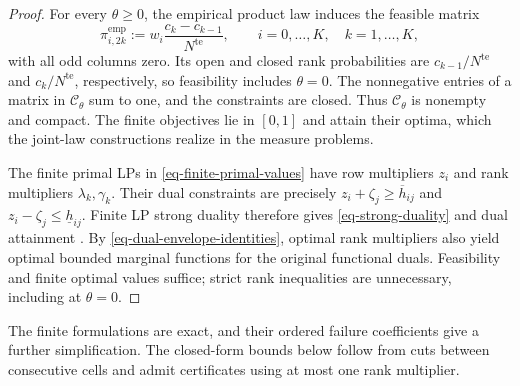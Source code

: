 \begin{proof}
  For every $\theta\ge0$, the empirical product law induces the feasible matrix
  \[
    \pi_{i,2k}^{\mathrm{emp}}:=w_i\frac{c_k-c_{k-1}}{N^{\mathrm{te}}},
    \qquad i=0,\ldots,K,\quad k=1,\ldots,K,
  \]
  with all odd columns zero. Its open and closed rank probabilities are $c_{k-1}/N^{\mathrm{te}}$ and $c_k/N^{\mathrm{te}}$, respectively, so feasibility includes $\theta=0$. The nonnegative entries of a matrix in $\mathcal C_\theta$ sum to one, and the constraints are closed. Thus $\mathcal C_\theta$ is nonempty and compact. The finite objectives lie in $[0,1]$ and attain their optima, which the joint-law constructions realize in the measure problems.

  The finite primal LPs in \eqref{eq-finite-primal-values} have row multipliers $z_i$ and rank multipliers $\lambda_k,\gamma_k$. Their dual constraints are precisely $z_i+\zeta_j\ge\overline h_{ij}$ and $z_i-\zeta_j\le\underline h_{ij}$. Finite LP strong duality therefore gives \eqref{eq-strong-duality} and dual attainment \citep[Section~5.2.3]{B.V04}. By \eqref{eq-dual-envelope-identities}, optimal rank multipliers also yield optimal bounded marginal functions for the original functional duals. Feasibility and finite optimal values suffice; strict rank inequalities are unnecessary, including at $\theta=0$.
\end{proof}

The finite formulations are exact, and their ordered failure coefficients give a further simplification. The closed-form bounds below follow from cuts between consecutive cells and admit certificates using at most one rank multiplier.


